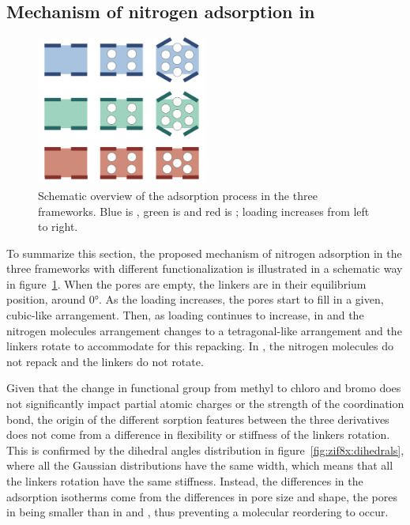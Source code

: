 \documentclass[thesis]{subfiles}
\begin{document}
\subsection{Mechanism of nitrogen adsorption in }

\begin{figure}[ht]
    \centering
    \includegraphics[width=0.5\textwidth]{figures/images/zif8x-summary}
    \caption{Schematic overview of the adsorption process in the three 
    frameworks. Blue is , green is \ZIFCl and red is \ZIFBr; loading
    increases from left to right.}
    \label{fig:zif8x:summary}
\end{figure}

To summarize this section, the proposed mechanism of nitrogen adsorption in the
three  frameworks with different functionalization is illustrated in a
schematic way in figure~\ref{fig:zif8x:summary}. When the pores are empty, the
linkers are in their equilibrium position, around 0°. As the loading increases,
the pores start to fill in a given, cubic-like arrangement. Then, as loading
continues to increase, in  and \ZIFCl the nitrogen molecules arrangement
changes to a tetragonal-like arrangement and the linkers rotate to accommodate
for this repacking. In \ZIFBr, the nitrogen molecules do not repack and the
linkers do not rotate.

Given that the change in functional group from methyl to chloro and bromo does
not significantly impact partial atomic charges or the strength of the 
coordination bond, the origin of the different sorption features between the
three  derivatives does not come from a difference in flexibility or
stiffness of the linkers rotation. This is confirmed by the dihedral angles
distribution in figure~\ref{fig:zif8x:dihedrals}, where all the Gaussian
distributions have the same width, which means that all the linkers rotation
have the same stiffness. Instead, the differences in the adsorption isotherms
come from the differences in pore size and shape, the pores in \ZIFBr being
smaller than in \ZIFCl and , thus preventing a molecular reordering to
occur.
\end{document}

